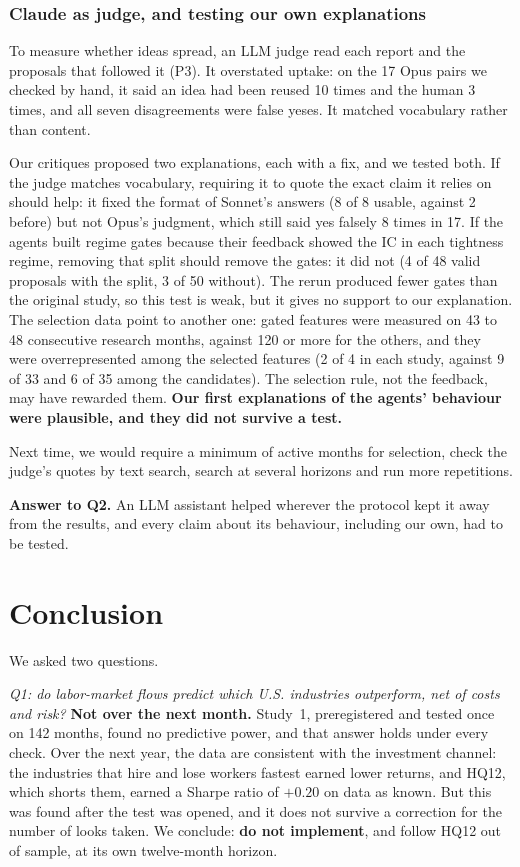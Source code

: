 \documentclass[11pt,letterpaper]{article}
\begin{document}
\subsubsection{Claude as judge, and testing our own explanations}
To measure whether ideas spread, an LLM judge read each report and the
proposals that followed it (P3). It overstated uptake: on the 17 Opus pairs we
checked by hand, it said an idea had been reused 10 times and the human 3
times, and all seven disagreements were false yeses. It matched vocabulary
rather than content.

Our critiques proposed two explanations, each with a fix, and we tested both.
If the judge matches vocabulary, requiring it to quote the exact claim it relies
on should help: it fixed the format of Sonnet's answers (8 of 8 usable, against
2 before) but not Opus's judgment, which still said yes falsely 8 times in 17.
If the agents built regime gates because their feedback showed the IC in each
tightness regime, removing that split should remove the gates: it did not (4 of
48 valid proposals with the split, 3 of 50 without). The rerun produced fewer
gates than the original study, so this test is weak, but it gives no support to
our explanation. The selection data point to another one: gated features were
measured on 43 to 48 consecutive research months, against 120 or more for the
others, and they were overrepresented among the selected features (2 of 4 in
each study, against 9 of 33 and 6 of 35 among the candidates). The selection
rule, not the feedback, may have rewarded them. \textbf{Our first explanations of the
agents' behaviour were plausible, and they did not survive a test.}

Next time, we would require a minimum of active months for selection, check
the judge's quotes by text search, search at several horizons and run more
repetitions.

\textbf{Answer to Q2.} An LLM assistant helped wherever
the protocol kept it away from the results, and every claim about its
behaviour, including our own, had to be tested.
\vspace{0.5cm}

\section{Conclusion}\label{sec:conclusion}
We asked two questions.

\emph{Q1: do labor-market flows predict which U.S. industries outperform, net of
costs and risk?} \textbf{Not over the next month.} Study~1, preregistered and tested once
on 142 months, found no predictive power, and that answer holds under every
check. Over the next year, the data are consistent with the investment channel:
the industries that hire and lose workers fastest earned lower returns, and
HQ12, which shorts them, earned a Sharpe ratio of $+0.20$ on data as known. But
this was found after the test was opened, and it does not survive a correction
for the number of looks taken. We conclude: \textbf{do not implement}, and
follow HQ12 out of sample, at its own twelve-month horizon.
\end{document}
